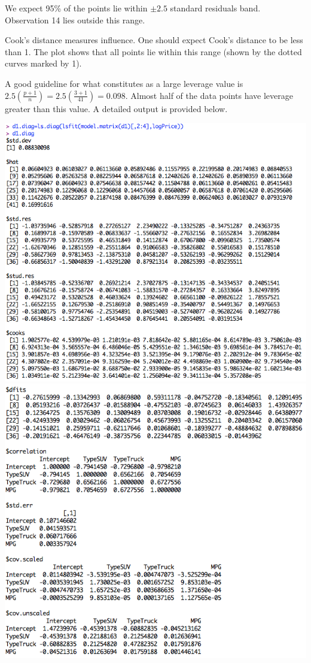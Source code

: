 \documentclass[a4 paper, 11 pt]{article}
\begin{document}
We expect 95\% of the points lie within $\pm 2.5$ standard residuals band. Observation 14 lies outside this range.

Cook's distance measures influence. One should expect Cook's distance to be less than 1. The plot shows that all points lie within this range (shown by the dotted curves marked by 1).

A good guideline for what constitutes as a large leverage value is $2.5\left( \frac{p+1}{n}\right) = 2.5 \left( \frac{3+1}{41}\right) = 0.098$. Almost half of the data points have leverage greater than this value. A detailed output is provided below.
\begin{center}
\includegraphics[scale=0.5]{diag1}
\includegraphics[scale=0.5]{diag2}
\end{center}
\end{document}
